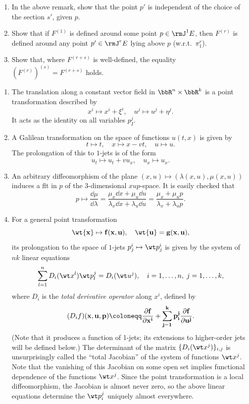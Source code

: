 \begin{xca}
    \begin{enumerate}
        \item In the above remark, show that the point $p'$ is independent of the choice of the section $s'$, given $p$.
        \item Show that if $F^{(1)}$ is defined around some point $p\in \rmJ^1E$, then $F^{(r)}$ is defined around any point $p'\in \rmJ^rE$ lying above $p$ (w.r.t.\ $\pi^r_1$).
        \item Show that, where $F^{(r+s)}$ is well-defined, the equality $\left(F^{(r)}\right)^{(s)}=F^{(r+s)}$ holds.
    \end{enumerate}
\end{xca}

\begin{example}
    \begin{enumerate}
        \item The translation along a constant vector field in $\bbR^n\times\bbR^k$ is a point transformation described by 
        \[x^i\mapsto x^i+\xi^i,\quad u^j\mapsto u^j+\eta^j.\]
        It acts as the identity on all variables $p^j_I$.
        \item A Galilean transformation on the space of functions $u(t,x)$ is given by 
        \[t\mapsto t,\quad x\mapsto x-vt,\quad u\mapsto u.\]
        The prolongation of this to $1$-jets is of the form 
        \[u_t\mapsto u_t+vu_x,\quad u_x\mapsto u_x.\]
        \item An arbitrary diffeomorphism of the plane $(x,u)\mapsto (\lambda(x,u),\mu(x,u))$ induces a \gls{flt} in $p$ of the $3$-dimensional $xup$-space. It is easily checked that
        \[p\mapsto \frac{\dd \mu}{\dd \lambda}=\frac{\mu_x\dd x+\mu_u\dd u}{\lambda_x\dd x+\lambda_u\dd u}=\frac{\mu_x+\mu_up}{\lambda_x+\lambda_up}.\]
        \item For a general point transformation 
        \[\wt{\bf{x}}\mapsto \bf{f}(\bf{x},\bf{u}),\quad \wt{\bf{u}}=\bf{g}(\bf{x},\bf{u}),\]
        its prolongation to the space of $1$-jets $p^i_j\mapsto \wt p^{i}_j$ is given by the system of $n k$ linear equations 
        \[\sum_{l=1}^n D_i(\wt x^{ l})\wt p_l^{j}=D_i(\wt u^{j}),\quad i=1,\ldots,n,\; j=1,\ldots,k,\]
        where $D_i$ is the \emph{total derivative operator} along $x^i$, defined by 
        \[(D_i f)(\bf{x},\bf{u},\bf{p})\coloneqq\frac{\partial f}{\partial x^i}+\sum_{j=1}^k p^j_i\frac{\partial f}{\partial u^j}.\label{def total deriv}\]
        (Note that it produces a function of 1-jets; its extensions to higher-order jets will be defined below.) The determinant of the matrix $\{D_i(\wt x^{j})\}_{i,j}$ is unsurprisingly called the ``total Jacobian'' of the system of functions $\wt x^{j}$. Note that the vanishing of this Jacobian on some open set implies functional dependence of the functions $\wt x^{j}$. Since the point transformation is a local diffeomorphism, the Jacobian is almost never zero, so the above linear equations determine the $\wt p^{j}_i$ uniquely almost everywhere.
    \end{enumerate}
\end{example}


